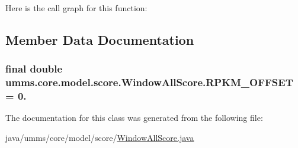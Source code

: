 Here is the call graph for this function\+:




\subsection{Member Data Documentation}
\hypertarget{classumms_1_1core_1_1model_1_1score_1_1_window_all_score_a7b84b3ecc3055c94193936e0b529a3fb}{
\subsubsection[{R\+P\+K\+M\+\_\+\+O\+F\+F\+S\+E\+T}]{\setlength{\rightskip}{0pt plus 5cm}final double umms.\+core.\+model.\+score.\+Window\+All\+Score.\+R\+P\+K\+M\+\_\+\+O\+F\+F\+S\+E\+T = 0.\hspace{0.3cm}{\ttfamily [static]}}}\label{classumms_1_1core_1_1model_1_1score_1_1_window_all_score_a7b84b3ecc3055c94193936e0b529a3fb}


The documentation for this class was generated from the following file\+:\begin{DoxyCompactItemize}
\item 
java/umms/core/model/score/\hyperlink{_window_all_score_8java}{Window\+All\+Score.\+java}\end{DoxyCompactItemize}
